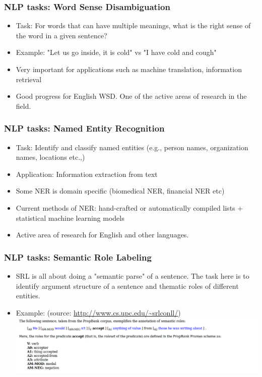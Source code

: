 \documentclass{beamer}
\begin{document}
\begin{frame}
\frametitle{NLP tasks: Word Sense Disambiguation}
\begin{itemize}
\item Task: For words that can have multiple meanings, what is the right sense of the word in a given sentence? 
\item Example: "Let us go inside, it is cold" vs "I have cold and cough"
\item Very important for applications such as machine translation, information retrieval
\item Good progress for English WSD. One of the active areas of research in the field.
\end{itemize}
\end{frame}

\begin{frame}
\frametitle{NLP tasks: Named Entity Recognition}
\begin{itemize}
\item Task: Identify and classify named entities (e.g., person names, organization names, locations etc.,) 
\item Application: Information extraction from text 
\item Some NER is domain specific (biomedical NER, financial NER etc)
\item Current methods of NER: hand-crafted or automatically compiled lists + statistical machine learning models
\item Active area of research for English and other languages. 
\end{itemize}
\end{frame}

\begin{frame}
\frametitle{NLP tasks: Semantic Role Labeling}
\begin{itemize}
\item SRL is all about doing a "semantic parse" of a sentence. The task here is to identify argument structure of a sentence and thematic roles of different entities.
\item Example: (source: \url{http://www.cs.upc.edu/~srlconll/})
\includegraphics[width=\textwidth]{SRL.png}
\end{itemize}
\end{frame}
\end{document}
